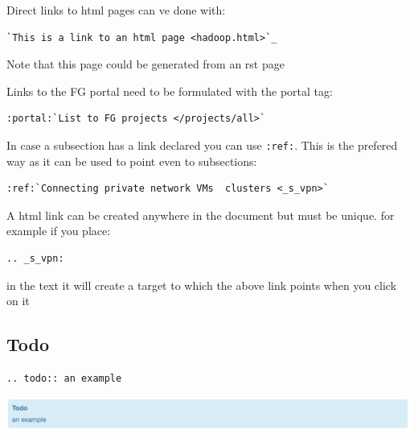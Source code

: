Direct links to html pages can ve done with:

\begin{verbatim}
`This is a link to an html page <hadoop.html>`_
\end{verbatim}

Note that this page could be generated from an rst page

Links to the FG portal need to be formulated with the portal tag:

\begin{verbatim}
:portal:`List to FG projects </projects/all>`
\end{verbatim}

In case a subsection has a link declared you can use \verb|:ref:|. This is the
prefered way as it can be used to point even to subsections:

\begin{verbatim}
:ref:`Connecting private network VMs  clusters <_s_vpn>` 
\end{verbatim}

A html link can be created anywhere in the document but must be unique.
for example if you place:

\begin{verbatim}
.. _s_vpn:
\end{verbatim}

in the text it will create a target to which the above link points when
you click on it

\subsection{Todo}\label{todo}

\begin{verbatim}
.. todo:: an example
\end{verbatim}

\includegraphics[width=\columnwidth]{images/todo.png}
